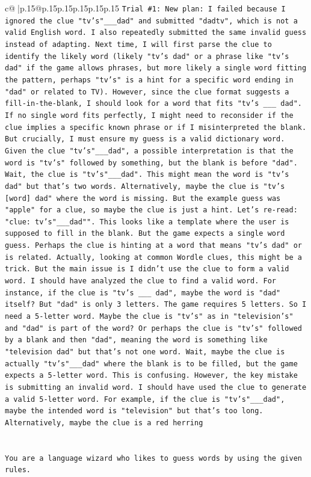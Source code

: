 \documentclass{article}
\begin{document}
{\begin{supertabular}{c@{$\;$}|p{.15\linewidth}@{}p{.15\linewidth}p{.15\linewidth}p{.15\linewidth}p{.15\linewidth}p{.15\linewidth}}
{{{\texttt{Trial \#1: New plan: I failed because I ignored the clue "tv's"\_\_\_dad" and submitted "dadtv", which is not a valid English word. I also repeatedly submitted the same invalid guess instead of adapting. Next time, I will first parse the clue to identify the likely word (likely "tv's dad" or a phrase like "tv's dad" if the game allows phrases, but more likely a single word fitting the pattern, perhaps "tv's" is a hint for a specific word ending in "dad" or related to TV). However, since the clue format suggests a fill{-}in{-}the{-}blank, I should look for a word that fits "tv's \_\_\_ dad". If no single word fits perfectly, I might need to reconsider if the clue implies a specific known phrase or if I misinterpreted the blank. But crucially, I must ensure my guess is a valid dictionary word. Given the clue "tv's"\_\_\_dad", a possible interpretation is that the word is "tv's" followed by something, but the blank is before "dad". Wait, the clue is "tv's"\_\_\_dad". This might mean the word is "tv's dad" but that's two words. Alternatively, maybe the clue is "tv's {[}word{]} dad" where the word is missing. But the example guess was "apple" for a clue, so maybe the clue is just a hint. Let's re{-}read: "clue: tv's"\_\_\_dad"". This looks like a template where the user is supposed to fill in the blank. But the game expects a single word guess. Perhaps the clue is hinting at a word that means "tv's dad" or is related. Actually, looking at common Wordle clues, this might be a trick. But the main issue is I didn't use the clue to form a valid word. I should have analyzed the clue to find a valid word. For instance, if the clue is "tv's \_\_\_ dad", maybe the word is "dad" itself? But "dad" is only 3 letters. The game requires 5 letters. So I need a 5{-}letter word. Maybe the clue is "tv's" as in "television's" and "dad" is part of the word? Or perhaps the clue is "tv's" followed by a blank and then "dad", meaning the word is something like "television dad" but that's not one word. Wait, maybe the clue is actually "tv's"\_\_\_dad" where the blank is to be filled, but the game expects a 5{-}letter word. This is confusing. However, the key mistake is submitting an invalid word. I should have used the clue to generate a valid 5{-}letter word. For example, if the clue is "tv's"\_\_\_dad", maybe the intended word is "television" but that's too long. Alternatively, maybe the clue is a red herring} \\
\\ 
\\ 
\texttt{You are a language wizard who likes to guess words by using the given rules.} \\
}}}
\end{supertabular}}
\end{document}

